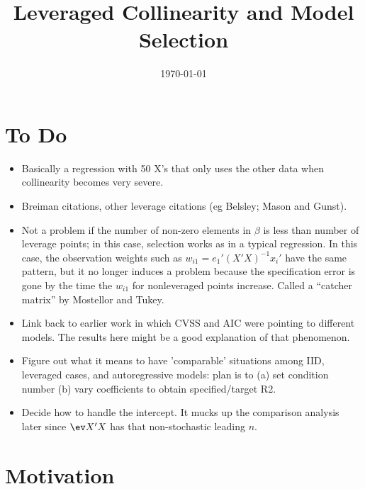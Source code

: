 \documentclass[12pt]{article}
\title{ Leveraged Collinearity and Model Selection }
\date{\today}
\begin{document}


\section{ To Do }

\begin{itemize}

 \item Basically a regression with 50 X's that only uses the other data when
 collinearity becomes very severe.

 \item Breiman citations, other leverage citations (eg Belsley; Mason and Gunst).

 \item Not a problem if the number of non-zero elements in $\beta$ is less than
 number of leverage points; in this case, selection works as in a typical
 regression.  In this case, the observation weights such as $w_{i1} =
 e_1'(X'X)^{-1}x_i'$ have the same pattern, but it no longer induces a problem
 because the specification error is gone by the time the $w_{i1}$ for
 nonleveraged points increase.  Called a ``catcher matrix'' by Mostellor and Tukey.

 \item Link back to earlier work in which CVSS and AIC were pointing to
 different models. The results here might be a good explanation of that
 phenomenon.

 \item Figure out what it means to have 'comparable' situations among IID,
 leveraged cases, and autoregressive models: plan is to (a) set condition number
 (b) vary coefficients to obtain specified/target R2.

 \item Decide how to handle the intercept. It mucks up the comparison analysis
 later since $\ev X'X$ has that non-stochastic leading $n$.

\end{itemize}


\section{ Motivation }
\label{sec:motivation}
\end{document}
